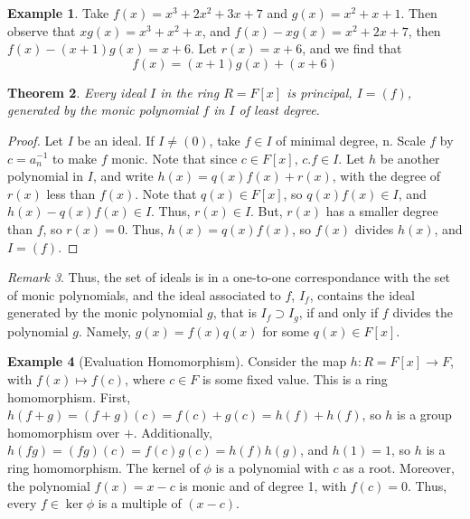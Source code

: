 \documentclass[12pt]{article}
\newtheorem{thm}{Theorem}[section]
\theoremstyle{definition}
\newtheorem{eg}[thm]{Example}
\theoremstyle{remark}
\newtheorem{rmk}[thm]{Remark}
\numberwithin{equation}{section}
\begin{document}
\begin{eg}
        Take $f(x) = x^3 +2x^2 + 3x + 7$ and $g(x) = x^2 + x + 1$. Then observe that $xg(x) = x^3+x^2+x$, and $f(x) - xg(x) = x^2+2x+7$, then $f(x) - (x+1)g(x) = x+6$. Let $r(x) = x+6$, and we find that $$f(x) = (x+1)g(x) + (x+6)$$
\end{eg}


\vspace{15pt}

\begin{thm}
        Every ideal $I$ in the ring $R = F[x]$ is principal, $I = (f)$, generated by the monic polynomial $f$ in $I$ of least degree.
\end{thm}
\begin{proof}
        Let $I$ be an ideal. If $I \neq (0)$, take $f \in I$ of minimal degree, n. Scale $f$ by $c = a_n^{-1}$ to make $f$ monic. Note that since $c \in F[x]$, $c.f \in I$. Let $h$ be another polynomial in $I$, and write $h(x) = q(x)f(x) + r(x)$, with the degree of $r(x)$ less than $f(x)$. Note that $q(x) \in F[x]$, so $q(x)f(x) \in I$, and $h(x) - q(x)f(x) \in I$. Thus, $r(x) \in I$. But, $r(x)$ has a smaller degree than $f$, so $r(x) = 0$. Thus, $h(x) = q(x)f(x)$, so $f(x)$ divides $h(x)$, and $I = (f)$. 
\end{proof}

\vspace{15pt}

\begin{rmk}
        Thus, the set of ideals is in a one-to-one correspondance with the set of monic polynomials, and the ideal associated to $f$, $I_f$, contains the ideal generated by the monic polynomial $g$, that is $I_f \supset I_g$, if and only if $f$ divides the polynomial $g$. Namely, $g(x)=f(x)q(x)$ for some $q(x) \in F[x]$. 
\end{rmk}

\vspace{15pt}


\begin{eg}[Evaluation Homomorphism]
        Consider the map $h:R = F[x] \rightarrow F$, with $f(x) \mapsto f(c)$, where $c \in F$ is some fixed value. This is a ring homomorphism. First, $h(f+g) = (f+g)(c) = f(c) + g(c) = h(f) + h(f)$, so $h$ is a group homomorphism over $+$. Additionally, $h(fg) = (fg)(c) = f(c)g(c) = h(f)h(g)$, and $h(1) = 1$, so $h$ is a ring homomorphism. The kernel of $\phi$ is a polynomial with $c$ as a root. Moreover, the polynomial $f(x) = x-c$ is monic and of degree 1, with $f(c) = 0$. Thus, every $f \in \ker \phi$ is a multiple of $(x-c)$. 
\end{eg}
\end{document}
